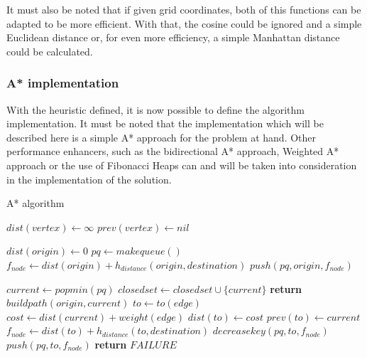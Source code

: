 \documentclass[a4paper, 12pt]{report}
\begin{document}
    It must also be noted that if given grid coordinates, both of this functions can be adapted to be more efficient. With that, the cosine could be ignored and a simple Euclidean distance or, for even more efficiency, a simple Manhattan distance could be calculated.
    
    \subsubsection{A* implementation}
    
    With the heuristic defined, it is now possible to define the algorithm implementation. It must be noted that the implementation which will be described here is a simple A* approach for the problem at hand. Other performance enhancers, such as the bidirectional A* approach, Weighted A* approach or the use of Fibonacci Heaps can and will be taken into consideration in the implementation of the solution.

    \begin{algorithm}[H]
    	\caption{A* algorithm} 
	    \begin{algorithmic}[1]
		    \State $dist(vertex) \leftarrow \infty$
		    \State $prev(vertex) \leftarrow nil$
		\EndFor

		\State $dist(origin) \leftarrow 0$
		\State $pq \leftarrow makequeue()$
		\State $f_{node} \leftarrow dist(origin) + h_{distance}(origin, destination)$
		\State $push(pq, origin, f_{node})$ 
		\end{algorithmic}
	\end{algorithm}
	
	\pagebreak
	\begin{algorithm}[H]
	    \begin{algorithmic}[1]
		    \State $current \leftarrow popmin(pq)$
		    \State $closedset \leftarrow closedset \cup \{current\}$
		        \State \textbf{return} $buildpath(origin, current)$
		    \EndIf
		        \State $to \leftarrow to(edge)$
		        \State $cost \leftarrow dist(current) + weight(edge)$
    	            \State $dist(to) \leftarrow cost$
    	            \State $prev(to) \leftarrow current$
    	            \State $f_{node} \leftarrow dist(to) + h_{distance}(to, destination)$
    	                \State $decreasekey(pq, to, f_{node})$
    	            \Else
    	                \State $push(pq, to, f_{node})$
    	            \EndIf
    	         \EndIf
		    \EndFor
		\EndWhile
		\State \textbf{return} $FAILURE$
		\end{algorithmic}
	\end{algorithm}
    
\end{document}

